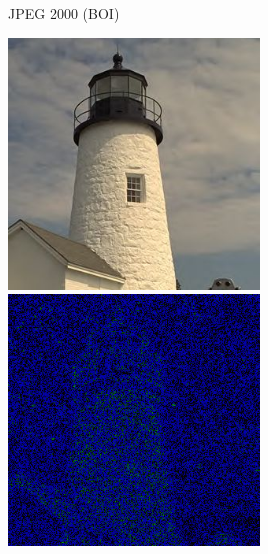 \documentclass{beamer}
\begin{document}
  \begin{frame}{JPEG 2000 (BOI)}
    \begin{multicols}{2}
      \includegraphics[width=0.5\textwidth]{figure/BOI_lighthouse050.jpg}
      \includegraphics[width=0.5\textwidth]{figure/psnr_BOI_lighthouse050.png}
    \end{multicols}
  \end{frame}
\end{document}
